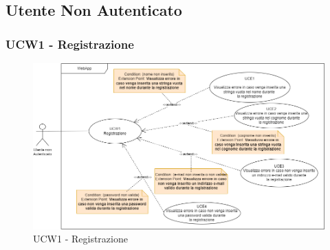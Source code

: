 \subsection{Utente Non Autenticato}
\subsubsection{UCW1 - Registrazione}
\begin{figure}[!h]
\centering
\includegraphics[scale=0.5]{UC_images/UCW1.png}
\caption{UCW1 - Registrazione}
\end{figure}
